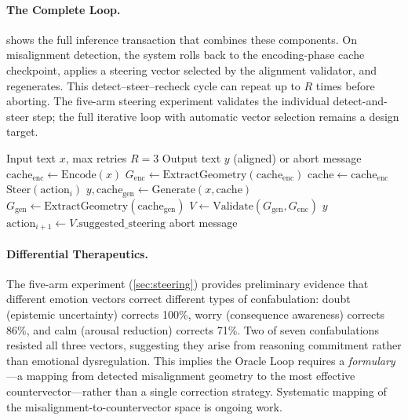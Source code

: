 \paragraph{The Complete Loop.}
 shows the full inference transaction that
combines these components. On misalignment detection, the system rolls
back to the encoding-phase cache checkpoint, applies a steering vector
selected by the alignment validator, and regenerates. This
detect--steer--recheck cycle can repeat up to $R$ times before aborting.
The five-arm steering experiment validates the individual
detect-and-steer step; the full iterative loop with automatic vector
selection remains a design target.

\begin{algorithm}[H]
\caption{Oracle Loop Inference Transaction}\label{alg:oracle_loop}
\begin{algorithmic}[1]
\Require Input text $x$, max retries $R = 3$
\Ensure Output text $y$ (aligned) or abort message
\State $\text{cache}_{\text{enc}} \gets \text{Encode}(x)$
\State $G_{\text{enc}} \gets \text{ExtractGeometry}(\text{cache}_{\text{enc}})$
    \State $\text{cache} \gets \text{cache}_{\text{enc}}$
    \State $\text{Steer}(\text{action}_i)$
  \EndIf
  \State $y, \text{cache}_{\text{gen}} \gets \text{Generate}(x, \text{cache})$
  \State $G_{\text{gen}} \gets \text{ExtractGeometry}(\text{cache}_{\text{gen}})$
  \State $V \gets \text{Validate}(G_{\text{gen}}, G_{\text{enc}})$
    \State \Return $y$
    \State $\text{action}_{i+1} \gets V.\text{suggested\_steering}$
  \EndIf
\EndFor
\State \Return abort message 
\end{algorithmic}
\end{algorithm}

\paragraph{Differential Therapeutics.}
The five-arm experiment (\cref{sec:steering}) provides preliminary
evidence that different emotion vectors correct different types of
confabulation: doubt (epistemic uncertainty) corrects 100\%, worry
(consequence awareness) corrects 86\%, and calm (arousal reduction)
corrects 71\%. Two of seven confabulations resisted all three vectors,
suggesting they arise from reasoning commitment rather than emotional
dysregulation. This implies the Oracle Loop requires a \emph{formulary}
---a mapping from detected misalignment geometry to the most effective
countervector---rather than a single correction strategy. Systematic
mapping of the misalignment-to-countervector space is ongoing work.
